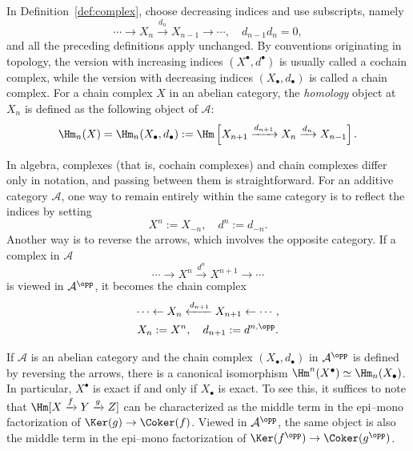 \begin{remark}\label{rem:cochain-vs-chain}
	In Definition~\ref{def:complex}, choose decreasing indices and use
	subscripts, namely
	\[ \cdots \to X_n \xrightarrow{d_n} X_{n-1} \to \cdots, \quad d_{n-1} d_n = 0, \]
	and all the preceding definitions apply unchanged. By conventions originating
	in topology, the version with increasing indices $(X^\bullet,d^\bullet)$ is
	usually called a cochain complex, while the version with decreasing indices
	$(X_\bullet,d_\bullet)$ is called a chain complex. For a chain complex $X$
	in an abelian category, the \emph{homology} object at $X_n$ is defined as the
	following object of $\mathcal{A}$:
	\[ \Hm_n(X) = \Hm_n(X_\bullet, d_\bullet) := \Hm\left[ X_{n+1} \xrightarrow{d_{n+1}} X_n \xrightarrow{d_n} X_{n-1} \right]. \]

	In algebra, complexes (that is, cochain complexes) and chain complexes differ
	only in notation, and passing between them is straightforward. For an
	additive category $\mathcal{A}$, one way to remain entirely within the same
	category is to reflect the indices by setting
	\[ X^n := X_{-n}, \quad d^n := d_{-n}. \]
	Another way is to reverse the arrows, which involves the opposite category.
	If a complex in $\mathcal{A}$
	\[ \cdots \to X^n \xrightarrow{d^n} X^{n+1} \to \cdots \]
	is viewed in $\mathcal{A}^{\opp}$, it becomes the chain complex
	\begin{gather*}
		\cdots \leftarrow X_n \xleftarrow{d_{n+1}} X_{n+1} \leftarrow \cdots, \\
		X_n := X^n, \quad d_{n+1} := d^{n, \opp}.
	\end{gather*}

	If $\mathcal{A}$ is an abelian category and the chain complex
	$(X_\bullet,d_\bullet)$ in $\mathcal{A}^{\opp}$ is defined by reversing
	the arrows, there is a canonical isomorphism
	$\Hm^n(X^\bullet)\simeq\Hm_n(X_\bullet)$. In particular, $X^\bullet$ is
	exact if and only if $X_\bullet$ is exact. To see this, it suffices to note
	that $\Hm[X \xrightarrow{f} Y \xrightarrow{g} Z]$ can be characterized as
	the middle term in the epi--mono factorization of
	$\Ker(g)\to\Coker(f)$. Viewed in $\mathcal{A}^{\opp}$, the same object is
	also the middle term in the epi--mono factorization of
	$\Ker(f^{\opp})\to\Coker(g^{\opp})$.
\end{remark}


